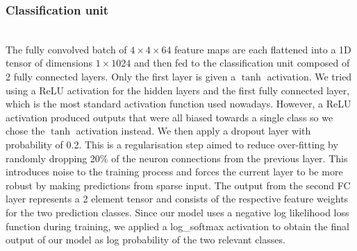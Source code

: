 \documentclass{l4proj}
\begin{document}
\subsubsection{Classification unit}\hfill\\
The fully convolved batch of \(4 \times 4 \times 64\) feature maps are each flattened into a 1D tensor of dimensions \(1 \times 1024\) and then fed to the classification unit composed of 2 fully connected layers. Only the first layer is given a \(\tanh\) activation. We tried using a ReLU activation for the hidden layers and the first fully connected layer, which is the most standard activation function used nowadays. However, a ReLU activation produced outputs that were all biased towards a single class so we chose the \(\tanh\) activation instead. We then apply a dropout layer with  probability of 0.2. This is a regularisation step aimed to reduce over-fitting by randomly dropping 20\% of the neuron connections from the previous layer. This introduces noise to the training process and forces the current layer to be more robust by making predictions from sparse input. The  output from the second FC layer represents a 2 element tensor and consists of the respective feature weights for the two prediction classes. Since our model uses a negative log likelihood loss function during training, we applied a log\_softmax activation to obtain the final output of our model as log probability of the two relevant classes. 
\end{document}
